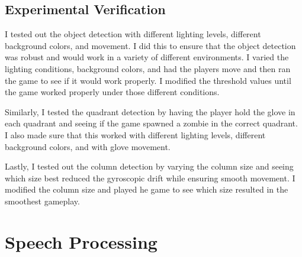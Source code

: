 \documentclass[titlepage, 12pt]{scrartcl}
\begin{document}
    \subsection{Experimental Verification}
    I tested out the object detection with different lighting levels, different background colors, and movement. I did this to ensure that the object detection was robust and would work in a variety of different environments. I varied the lighting conditions, background colors, and had the players move and then ran the game to see if it would work properly. I modified the threshold values until the game worked properly under those different conditions.\par
    Similarly, I tested the quadrant detection by having the player hold the glove in each quadrant and seeing if the game spawned a zombie in the correct quadrant. I also made sure that this worked with different lighting levels, different background colors, and with glove movement.\par
    Lastly, I tested out the column detection by varying the column size and seeing which size best reduced the gyroscopic drift while ensuring smooth movement. I modified the column size and played he game to see which size resulted in the smoothest gameplay.
   

\section{Speech Processing}
\end{document}
